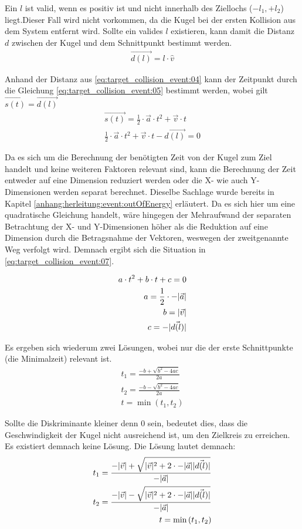 Ein $l$ ist valid, wenn es positiv ist und nicht innerhalb des Ziellochs ($-l_1, +l_2$) liegt.Dieser Fall wird nicht vorkommen, da die
Kugel bei der ersten Kollision aus dem System entfernt wird.
Sollte ein valides $l$ existieren, kann damit die Distanz $d$ zwischen der Kugel und dem Schnittpunkt bestimmt werden.
\begin{align}
    \vec{d(l)} = l \cdot \hat{v}\label{eq:target_collision_event:04}
\end{align}

Anhand der Distanz aus \ref{eq:target_collision_event:04} kann der Zeitpunkt durch die Gleichung \ref{eq:target_collision_event:05}
bestimmt werden, wobei gilt $\vec{s(t)} = \vec{d(l)}$
\begin{align}
    \vec{s(t)} = \frac{1}{2} \cdot \vec{a} \cdot t^2 + \vec{v} \cdot t\\\label{eq:target_collision_event:05}
    \frac{1}{2} \cdot \vec{a} \cdot t^2 + \vec{v} \cdot t - \vec{d(l)} = 0
\end{align}

Da es sich um die Berechnung der benötigten Zeit von der Kugel zum Ziel handelt und keine weiteren Faktoren relevant sind,
kann die Berechnung der Zeit entweder auf eine Dimension reduziert werden oder die X- wie auch Y-Dimensionen werden separat
berechnet. Dieselbe Sachlage wurde bereits in Kapitel \ref{anhang:herleitung:event:outOfEnergy} erläutert. Da es sich
hier um eine quadratische Gleichung handelt, wäre hingegen der Mehraufwand der separaten Betrachtung der X- und Y-Dimensionen
höher als die Reduktion auf eine Dimension durch die Betragsnahme der Vektoren, weswegen der zweitgenannte Weg verfolgt
wird. Demnach ergibt sich die Situation in \ref{eq:target_collision_event:07}.

\begin{align}
    a \cdot t^2 + b \cdot t + c = 0\\\label{eq:target_collision_event:07}
    a = \frac{1}{2} \cdot -\lvert \vec{a} \rvert\\
    b = \lvert \vec{v} \rvert\\
    c = -\lvert \vec{d(l)} \rvert
\end{align}

Es ergeben sich wiederum zwei Lösungen, wobei nur die der erste Schnittpunkte (die Minimalzeit) relevant ist.
\begin{align}
    t_1 = \frac{-b + \sqrt{b^2 - 4ac}}{2a}\\
    t_2 = \frac{-b - \sqrt{b^2 - 4ac}}{2a}\\
    t = \min{(t_1, t_2)}
\end{align}

Sollte die Diskriminante kleiner denn $0$ sein, bedeutet dies, dass die Geschwindigkeit der Kugel nicht ausreichend
ist, um den Zielkreis zu erreichen. Es existiert demnach keine Lösung. Die Lösung lautet demnach:
\begin{align}
    t_1 = \frac{-\lvert \vec{v} \rvert + \sqrt{\lvert \vec{v} \rvert^2 + 2 \cdot -\lvert \vec{a} \rvert \lvert \vec{d(l)} \rvert}}{-\lvert \vec{a} \rvert}\\
    t_2 = \frac{-\lvert \vec{v} \rvert - \sqrt{\lvert \vec{v} \rvert^2 + 2 \cdot -\lvert \vec{a} \rvert \lvert \vec{d(l)} \rvert}}{-\lvert \vec{a} \rvert}\\
    t = \min{(t_1, t_2)}
\end{align}